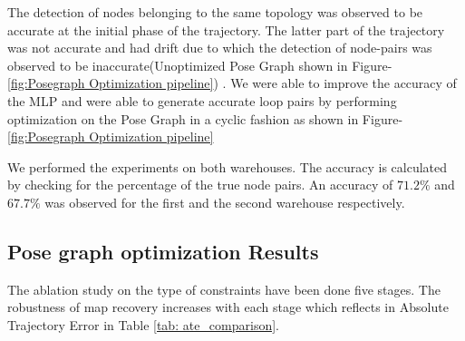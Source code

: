 \documentclass[letterpaper, 10 pt, conference]{ieeeconf}  %
\begin{document}
	The detection of nodes belonging to the same topology was observed to be accurate at the initial phase of the trajectory. The latter part of the trajectory was not accurate and had drift due to which the detection of node-pairs was observed to be inaccurate(Unoptimized Pose Graph shown in  Figure-\ref{fig:Posegraph Optimization pipeline}) . We were able to improve the accuracy of the MLP and were able to generate accurate loop pairs by performing optimization on the Pose Graph in a cyclic fashion as shown in Figure-\ref{fig:Posegraph Optimization pipeline}
	
	We performed the experiments on both warehouses. The accuracy is calculated by checking for the percentage of the true node pairs. An accuracy of $71.2 \%$ and $67.7 \%$ was observed for the first and the second warehouse respectively. 
	
	\subsection{Pose graph optimization Results}
	
	The ablation study on the type of constraints have been done five stages. The robustness of map recovery increases with each stage which reflects in Absolute Trajectory Error in Table \ref{tab: ate_comparison}. 
	
\end{document}
